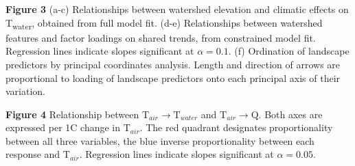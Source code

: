 \documentclass[notitlepage]{article}
\begin{document}
\textbf{Figure 3} (a-c) Relationships between watershed elevation and climatic effects on T\textsubscript{water}, obtained from full model fit. (d-e) Relationships between watershed features and factor loadings on shared trends, from constrained model fit. Regression lines indicate slopes significant at $\alpha=0.1$. (f) Ordination of landscape predictors by principal coordinates analysis. Length and direction of arrows are proportional to loading of landscape predictors onto each principal axis of their variation.

\begin{center}
\end{center}
\textbf{Figure 4} Relationship between $\textrm{T}_{air}\rightarrow \textrm{T}_{water}$ and $\textrm{T}_{air}\rightarrow \textrm{Q}$. Both axes are expressed per 1\degree C change in $\textrm{T}_{air}$. The red quadrant designates proportionality between all three variables, the blue inverse proportionality between each response and $\textrm{T}_{air}$. Regression lines indicate slopes significant at $\alpha=0.05$.
\\[\baselineskip]
\end{document}
